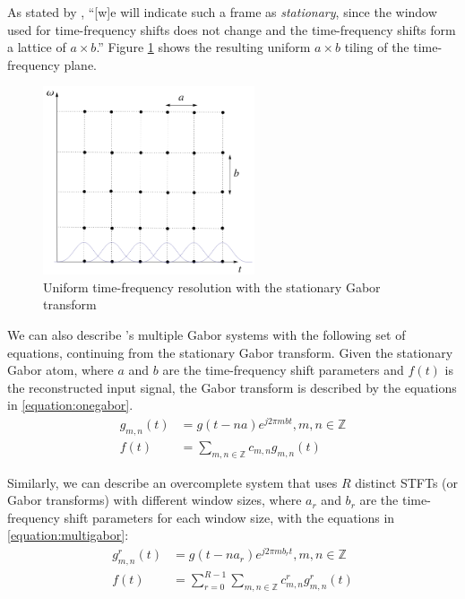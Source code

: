\documentclass[report.tex]{subfiles}
\begin{document}
As stated by \textcite{adaptivecqt}, ``[w]e will indicate such a frame as \textit{stationary}, since the window used for time-frequency shifts does not change and the time-frequency shifts form a lattice of $a \times b$.'' Figure \ref{fig:uniformtflattice} shows the resulting uniform $a \times b$ tiling of the time-frequency plane.

\begin{figure}[ht]
	\centering
	\includegraphics[width=6.25cm]{./images-tftheory/stationarygabor.png}
	\caption{Uniform time-frequency resolution with the stationary Gabor transform}
	\label{fig:uniformtflattice}
\end{figure}

We can also describe \textcite{doerflerphd}'s multiple Gabor systems with the following set of equations, continuing from the stationary Gabor transform. Given the stationary Gabor atom, where $a$ and $b$ are the time-frequency shift parameters and $f(t)$ is the reconstructed input signal, the Gabor transform is described by the equations in \ref{equation:onegabor}.
\begin{align}
	\nonumber g_{m,n}(t) &= g(t - na)e^{j2\pi m b t}, m,n \in \mathbb{Z}\\
	\nonumber f(t) &= \sum_{m,n \in \mathbb{Z}}c_{m,n}g_{m,n}(t) \tag{12}\label{equation:onegabor}
\end{align}

Similarly, we can describe an overcomplete system that uses $R$ distinct STFTs (or Gabor transforms) with different window sizes, where $a_{r}$ and $b_{r}$ are the time-frequency shift parameters for each window size, with the equations in \ref{equation:multigabor}:
\begin{align}
	\nonumber g_{m,n}^{r}(t) &= g(t - na_{r})e^{j2\pi m b_{r} t}, m,n \in \mathbb{Z}\\
	\nonumber f(t) &= \sum_{r=0}^{R-1}\sum_{m,n \in \mathbb{Z}}c^{r}_{m,n}g^{r}_{m,n}(t) \tag{13}\label{equation:multigabor}
\end{align}
\end{document}
